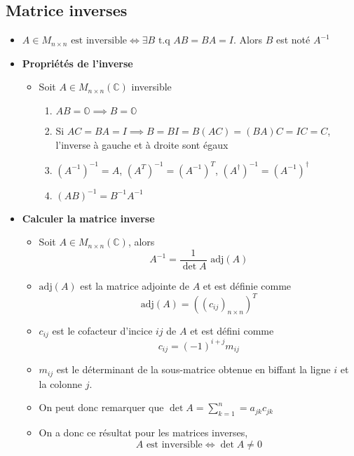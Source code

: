 \subsection*{Matrice inverses}
\begin{itemize}
    \item[] $A \in M_{n \times n} \text{ est inversible} \iff \exists B \text{ t.q } AB = BA = I$. Alors $B$ est noté $A^{-1}$
    \item[] \textbf{Propriétés de l'inverse} \begin{itemize}
              \item[] Soit $A \in M_{n \times n}(\mathbb{C})$ inversible \begin{enumerate}
                        \item $AB = \mathbb{O} \implies B = \mathbb{O}$
                        \item Si $AC = BA = I \implies B = BI = B(AC) = (BA)C = IC = C $, l'inverse à gauche et à droite sont égaux
                        \item $(A^{-1})^{-1} = A$, \quad $(A^T)^{-1} = (A^{-1})^{T}$, \quad $(A^\dagger)^{-1} = (A^{-1})^{\dagger}$
                        \item $(AB)^{-1} = B^{-1}A^{-1}$
                    \end{enumerate}
          \end{itemize}
    \item[] \textbf{Calculer la matrice inverse}
          \begin{itemize}
              \item[] Soit $A \in M_{n \times n}(\mathbb{C})$, alors
                    \begin{equation*}
                        A^{-1} = \frac{1}{\det A} \text{ adj}(A)
                    \end{equation*}
              \item[] $\text{adj}(A)$ est la matrice adjointe de $A$ et est définie comme \begin{equation*}
                        \text{adj}(A) = \left( \left( c_{ij} \right)_{n \times n} \right)^T
                    \end{equation*}
              \item[] $c_{ij}$ est le cofacteur d'incice $ij$ de $A$ et est défini comme \begin{equation*}
                        c_{ij} = (-1)^{i + j}m_{ij}
                    \end{equation*}
              \item[] $m_{ij}$ est le déterminant de la sous-matrice obtenue en biffant la ligne $i$ et la colonne $j$.
              \item[] On peut donc remarquer que $\det A = \sum_{k = 1}^{n} = a_{jk} c_{jk}$
              \item[] On a donc ce résultat pour les matrices inverses, \begin{equation*}
                        A \text{ est inversible} \iff \det A \neq 0
                    \end{equation*}
          \end{itemize}
\end{itemize}

